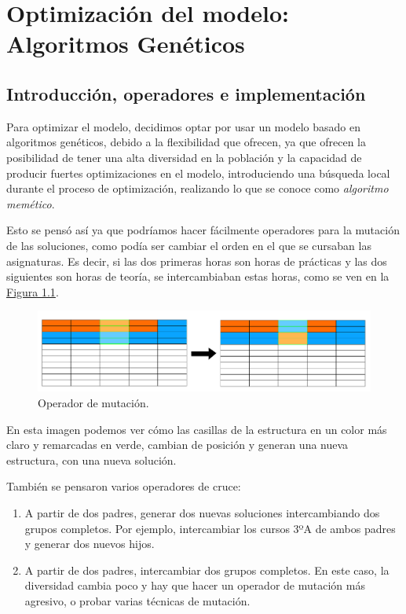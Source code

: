 \chapter{Optimización del modelo: Algoritmos Genéticos}

\section{Introducción, operadores e implementación}

Para optimizar el modelo, decidimos optar por usar un modelo basado en algoritmos genéticos, debido a la flexibilidad que ofrecen, ya que ofrecen la posibilidad de tener una alta diversidad en la población y la capacidad de producir fuertes optimizaciones en el modelo, introduciendo una búsqueda local durante el proceso de optimización, realizando lo que se conoce como \textit{algoritmo memético}.

Esto se pensó así ya que podríamos hacer fácilmente operadores para la mutación de las soluciones, como podía ser cambiar el orden en el que se cursaban las asignaturas. Es decir, si las dos primeras horas son horas de prácticas y las dos siguientes son horas de teoría, se intercambiaban estas horas, como se ven en la \hyperref[mut1]{Figura \ref*{mut1}}.

\begin{figure}[H]
\centering
\includegraphics[width=1\textwidth]{img/mut1}
\caption{Operador de mutación.}
\label{mut1}
\end{figure}

En esta imagen podemos ver cómo las casillas de la estructura en un color más claro y remarcadas en verde, cambian de posición y generan una nueva estructura, con una nueva solución. 

También se pensaron varios operadores de cruce:

\begin{enumerate}
	\item A partir de dos padres, generar dos nuevas soluciones intercambiando dos grupos completos. Por ejemplo, intercambiar los cursos 3ºA de ambos padres y generar dos nuevos hijos.
	\item A partir de dos padres, intercambiar dos grupos completos. En este caso, la diversidad cambia poco y hay que hacer un operador de mutación más agresivo, o probar varias técnicas de mutación.
\end{enumerate}

